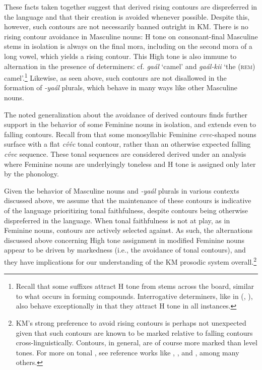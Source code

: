 \documentclass[output=paper,colorlinks,citecolor=brown]{langscibook}
\begin{document}
These facts taken together suggest that derived rising contours are dispreferred in the language and that their creation is avoided whenever possible. Despite this, however, such contours are not necessarily banned outright in KM. There is no rising contour avoidance in Masculine nouns: H tone on consonant-final Masculine stems in isolation is always on the final mora, including on the second mora of a long vowel, which yields a rising contour. This High tone is also immune to alternation in the presence of determinersː cf. \textit{gaál} `camel' and \textit{gaál-kii} `the (\textsc{rem}) camel'.\footnote{Recall that some suffixes attract H tone from stems across the board, similar to what occurs in forming  compounds. Interrogative determiners, like in  (\citealt[245]{greensomgram}, \citealt[114]{saeed1999}), also behave exceptionally in that they attract H tone in all instances.} Likewise, as seen above, such contours are not disallowed in the formation of \textit{-yaál} plurals, which behave in many ways like other Masculine nouns. 

The noted generalization about the  avoidance of derived contours finds further support in the behavior of some Feminine nouns in isolation, and extends even to falling contours. Recall from  that some monosyllabic Feminine \textit{cvvc}-shaped nouns surface with a flat \textit{cv́v́c} tonal contour, rather than an otherwise expected falling \textit{cv́vc} sequence. These tonal sequences are considered derived under an analysis where Feminine nouns are underlyingly toneless and H tone is assigned only later by the phonology.

Given the behavior of Masculine nouns and \textit{-yaál} plurals in various contexts discussed above, we assume that the maintenance of these contours is indicative of the language prioritizing tonal faithfulness, despite contours being otherwise dispreferred in the language. When tonal faithfulness is not at play, as in Feminine nouns, contours are actively selected against. As such, the alternations discussed above concerning High tone assignment in modified Feminine nouns appear to be driven by markedness (i.e., the avoidance of tonal contours), and they have implications for our understanding of the KM prosodic system overall.{\footnote{KM's strong preference to avoid rising contours is perhaps not unexpected given that such contours are known to be marked relative to falling contours cross-linguistically. Contours, in general, are of course more marked than level tones. For more on tonal , see reference works like \citet{Gordon2001}, \citet{Hyman2009b}, and \citet[27--30]{Yip2002}, among many others.}}
\end{document}
